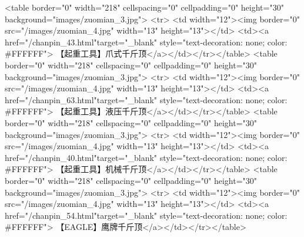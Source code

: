                                                             <table border="0" width="218" cellspacing="0" cellpadding="0" height="30" background="images/zuomian_3.jpg">
                                                                <tr>
                                                                    <td width="12"><img border="0" src="/images/zuomian_4.jpg" width="13" height="13"></td>
                                                                    <td><a href="/chanpin_43.html"target="_blank" style="text-decoration: none; color: #FFFFFF">
                                                                            【起重工具】爪式千斤顶</a></td></tr></table>
                                                            <table border="0" width="218" cellspacing="0" cellpadding="0" height="30" background="images/zuomian_3.jpg">
                                                                <tr>
                                                                    <td width="12"><img border="0" src="/images/zuomian_4.jpg" width="13" height="13"></td>
                                                                    <td><a href="/chanpin_63.html"target="_blank" style="text-decoration: none; color: #FFFFFF">
                                                                            【起重工具】液压千斤顶</a></td></tr></table>
                                                            <table border="0" width="218" cellspacing="0" cellpadding="0" height="30" background="images/zuomian_3.jpg">
                                                                <tr>
                                                                    <td width="12"><img border="0" src="/images/zuomian_4.jpg" width="13" height="13"></td>
                                                                    <td><a href="/chanpin_40.html"target="_blank" style="text-decoration: none; color: #FFFFFF">
                                                                            【起重工具】机械千斤顶</a></td></tr></table>
                                                            <table border="0" width="218" cellspacing="0" cellpadding="0" height="30" background="images/zuomian_3.jpg">
                                                                <tr>
                                                                    <td width="12"><img border="0" src="/images/zuomian_4.jpg" width="13" height="13"></td>
                                                                    <td><a href="/chanpin_54.html"target="_blank" style="text-decoration: none; color: #FFFFFF">
                                                                            【EAGLE】鹰牌千斤顶</a></td></tr></table>
